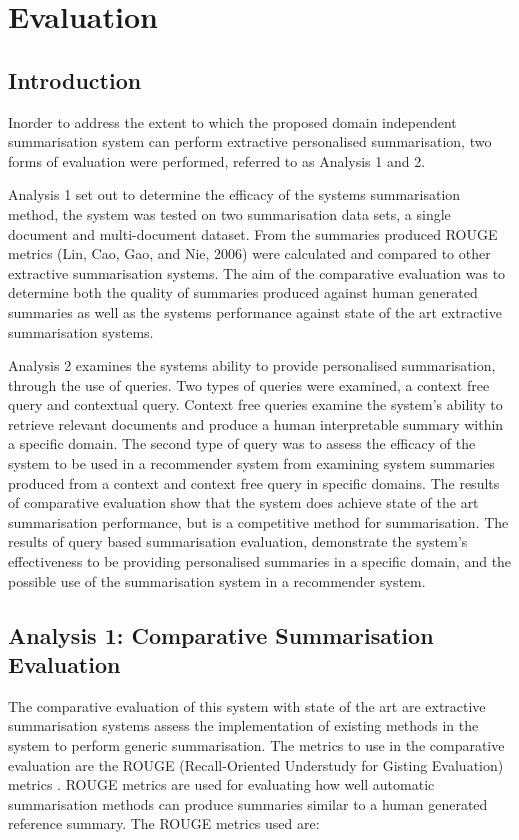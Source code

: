 \chapter{Evaluation}
\label{chp:5}
\section{Introduction}
Inorder to address the extent to which the proposed domain independent summarisation system can perform extractive personalised summarisation, two forms of evaluation were performed, referred to as Analysis 1 and 2. 

Analysis 1 set out to determine the efficacy of the systems summarisation method, the system was tested on two summarisation data sets, a single document and multi-document dataset. From the summaries produced ROUGE metrics (Lin, Cao, Gao, and Nie, 2006) were calculated and compared to other extractive summarisation systems. The aim of the comparative evaluation was to determine both the quality of summaries produced against human generated summaries as well as the systems performance against state of the art extractive summarisation systems. 

Analysis 2 examines the systems ability to provide personalised summarisation, through the use of queries. Two types of queries were examined, a context free query and contextual query. Context free queries examine the system's ability to retrieve relevant documents and produce a human interpretable summary within a specific domain. The second type of query was to assess the efficacy of the system to be used in a recommender system from examining system summaries produced from a context and context free query in specific domains. The results of comparative evaluation show that the system does achieve state of the art summarisation performance, but is a competitive method for summarisation. The results of query based summarisation evaluation, demonstrate the system's effectiveness to be providing personalised summaries in a specific domain, and the possible use of the summarisation system in a recommender system.

\section{Analysis 1: Comparative Summarisation Evaluation}
The comparative evaluation of this system with state of the art are extractive summarisation systems assess the implementation of existing methods in the system to perform generic summarisation. The metrics to use in the comparative evaluation are the ROUGE (Recall-Oriented Understudy for Gisting Evaluation) metrics \citep{lin2004rouge}. ROUGE metrics are used for evaluating how well automatic summarisation methods can produce summaries similar to a human generated reference summary. The ROUGE metrics used are:

